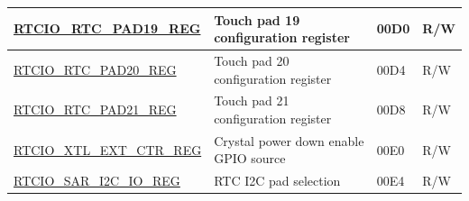 \begin{longtable}{ | p{6.2cm} | p{7cm} | p{1.3cm} | p{1cm} | }
\hyperref[regdesc:RTCIORTCPAD19REG]{RTCIO\_RTC\_PAD19\_REG} & Touch pad 19 configuration register & \hexprefix{}00D0 & R/W \\ \hline
\hyperref[regdesc:RTCIORTCPAD20REG]{RTCIO\_RTC\_PAD20\_REG} & Touch pad 20 configuration register & \hexprefix{}00D4 & R/W \\ \hline
\hyperref[regdesc:RTCIORTCPAD21REG]{RTCIO\_RTC\_PAD21\_REG} & Touch pad 21 configuration register & \hexprefix{}00D8 & R/W \\ \hline
\hyperref[regdesc:RTCIOXTLEXTCTRREG]{RTCIO\_XTL\_EXT\_CTR\_REG} & Crystal power down enable GPIO source & \hexprefix{}00E0 & R/W \\ \hline
\hyperref[regdesc:RTCIOSARI2CIOREG]{RTCIO\_SAR\_I2C\_IO\_REG} & RTC I2C pad selection & \hexprefix{}00E4 & R/W \\ \hline
\end{longtable}
